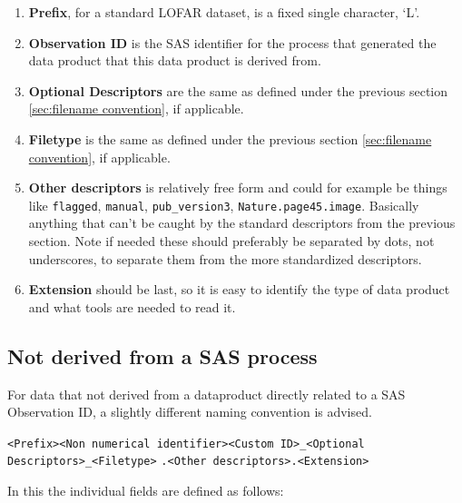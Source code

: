 \documentclass[a4paper,10pt,bibtotoc]{scrartcl}
\begin{document}
\begin{enumerate}
\item \textbf{Prefix}, for a standard LOFAR dataset, is a fixed single
  character, `L'.
\item \textbf{Observation ID} is the SAS identifier for the process
  that generated the data product that this data product is derived
  from.
\item \textbf{Optional Descriptors} are the same as defined under the
  previous section \ref{sec:filename convention}, if applicable.
\item \textbf{Filetype} is the same as defined under the previous
  section \ref{sec:filename convention}, if applicable.
\item \textbf{Other descriptors} is relatively free form and could for
  example be things like \verb|flagged|, \verb|manual|,
  \verb|pub_version3|, \verb|Nature.page45.image|. Basically anything
  that can't be caught by the standard descriptors from the previous
  section. Note if needed these should preferably be separated by
  dots, not underscores, to separate them from the more standardized
  descriptors.
\item \textbf{Extension} should be last, so it is easy to identify the
  type of data product and what tools are needed to read it.
\end{enumerate}

\subsection{Not derived from a SAS process}

For data that not derived from a dataproduct directly related to a SAS
Observation ID, a slightly different naming convention is advised.

\begin{center}
  \verb|<Prefix><Non numerical identifier><Custom ID>_<Optional Descriptors>_<Filetype>|
  \verb|.<Other descriptors>.<Extension>|
\end{center}

In this the individual fields are defined as follows:
\end{document}
